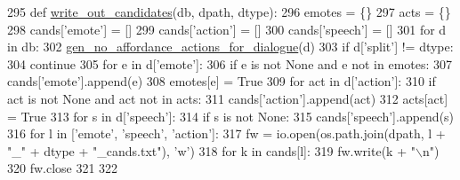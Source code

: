 \begin{DoxyCode}
295 \textcolor{keyword}{def }\hyperlink{namespaceparlai_1_1tasks_1_1light__dialog_1_1builder_a25aca9f28e4406290624e1d0c5cce0d6}{write\_out\_candidates}(db, dpath, dtype):
296     emotes = \{\}
297     acts = \{\}
298     cands[\textcolor{stringliteral}{'emote'}] = []
299     cands[\textcolor{stringliteral}{'action'}] = []
300     cands[\textcolor{stringliteral}{'speech'}] = []
301     \textcolor{keywordflow}{for} d \textcolor{keywordflow}{in} db:
302         \hyperlink{namespaceparlai_1_1tasks_1_1light__dialog_1_1builder_a537e075c89058b67eb0db786f98491de}{gen\_no\_affordance\_actions\_for\_dialogue}(d)
303         \textcolor{keywordflow}{if} d[\textcolor{stringliteral}{'split'}] != dtype:
304             \textcolor{keywordflow}{continue}
305         \textcolor{keywordflow}{for} e \textcolor{keywordflow}{in} d[\textcolor{stringliteral}{'emote'}]:
306             \textcolor{keywordflow}{if} e \textcolor{keywordflow}{is} \textcolor{keywordflow}{not} \textcolor{keywordtype}{None} \textcolor{keywordflow}{and} e \textcolor{keywordflow}{not} \textcolor{keywordflow}{in} emotes:
307                 cands[\textcolor{stringliteral}{'emote'}].append(e)
308                 emotes[e] = \textcolor{keyword}{True}
309         \textcolor{keywordflow}{for} act \textcolor{keywordflow}{in} d[\textcolor{stringliteral}{'action'}]:
310             \textcolor{keywordflow}{if} act \textcolor{keywordflow}{is} \textcolor{keywordflow}{not} \textcolor{keywordtype}{None} \textcolor{keywordflow}{and} act \textcolor{keywordflow}{not} \textcolor{keywordflow}{in} acts:
311                 cands[\textcolor{stringliteral}{'action'}].append(act)
312                 acts[act] = \textcolor{keyword}{True}
313         \textcolor{keywordflow}{for} s \textcolor{keywordflow}{in} d[\textcolor{stringliteral}{'speech'}]:
314             \textcolor{keywordflow}{if} s \textcolor{keywordflow}{is} \textcolor{keywordflow}{not} \textcolor{keywordtype}{None}:
315                 cands[\textcolor{stringliteral}{'speech'}].append(s)
316     \textcolor{keywordflow}{for} l \textcolor{keywordflow}{in} [\textcolor{stringliteral}{'emote'}, \textcolor{stringliteral}{'speech'}, \textcolor{stringliteral}{'action'}]:
317         fw = io.open(os.path.join(dpath, l + \textcolor{stringliteral}{"\_"} + dtype + \textcolor{stringliteral}{"\_cands.txt"}), \textcolor{stringliteral}{'w'})
318         \textcolor{keywordflow}{for} k \textcolor{keywordflow}{in} cands[l]:
319             fw.write(k + \textcolor{stringliteral}{"\(\backslash\)n"})
320         fw.close
321 
322 
\end{DoxyCode}


